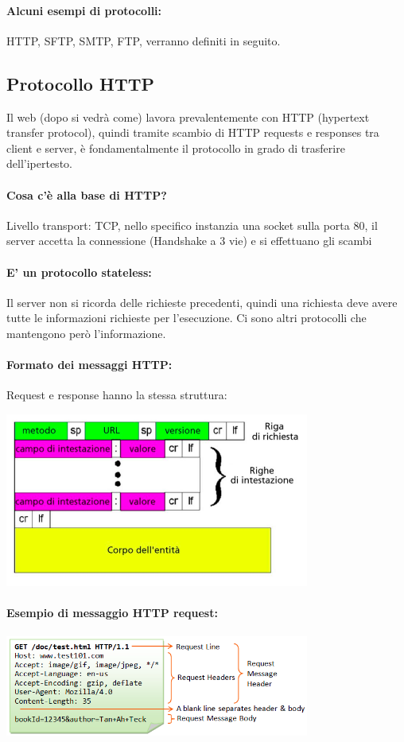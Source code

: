 \documentclass[12pt, a4paper, openany, twoside]{book}
\begin{document}
\paragraph{Alcuni esempi di protocolli:} HTTP, SFTP, SMTP, FTP, verranno definiti
in seguito.
\subsection{Protocollo HTTP}
Il web (dopo si vedrà come) lavora prevalentemente con HTTP (hypertext transfer
protocol), quindi tramite 
scambio di HTTP requests e responses tra client e server, è fondamentalmente
il protocollo in grado di trasferire dell'ipertesto.
\paragraph{Cosa c'è alla base di HTTP?} Livello transport: TCP, nello specifico
instanzia una socket sulla porta 80, il server accetta la connessione (Handshake
a 3 vie) e si effettuano gli scambi
\paragraph{E' un protocollo stateless: } Il server non si ricorda delle richieste
precedenti, quindi una richiesta deve avere tutte le informazioni richieste per
l'esecuzione. Ci sono altri protocolli che mantengono però l'informazione.
\paragraph{Formato dei messaggi HTTP: } Request e response hanno la stessa
struttura: 
\begin{center}
\includegraphics[width=0.75\textwidth]{2}
\end{center}
\paragraph{Esempio di messaggio HTTP request:}
\begin{center}
\includegraphics[width=0.75\textwidth]{3}
\end{center}
\end{document}
